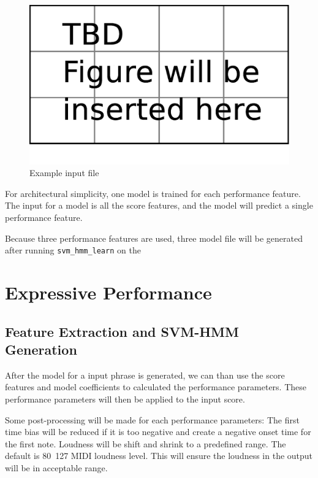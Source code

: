       \begin{figure}[tp]
         \begin{center}
            \includegraphics[width=\textwidth]{fig/TBDFigure}
         \end{center}
         \caption{Example input file} 
         \label{fig:expinput}
      \end{figure}

For architectural simplicity, one model is trained for each performance feature. The input for a model is all the score features, and the model will predict a single performance feature. 


Because three performance features are used, three model file will be generated after running \texttt{svm\_hmm\_learn} on the 

   \section{Expressive Performance}
   \subsection{Feature Extraction and SVM-HMM Generation}
      After the model for a input phrase is generated, we can than use the score features and model coefficients to calculated the performance parameters. These performance parameters will then be applied to the input score.
      
      Some post-processing will be made for each performance parameters: The first time bias will be reduced if it is too negative and create a negative onset time for the first note. Loudness will be shift and shrink to a predefined range. The default is 80~127 MIDI loudness level. This will ensure the loudness in the output will be in acceptable range. 
      
